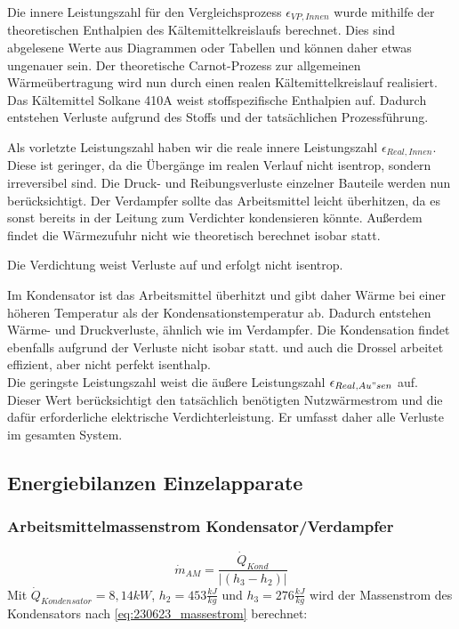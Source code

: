 Die innere Leistungszahl für den Vergleichsprozess $\epsilon_{VP,Innen}$ wurde mithilfe der theoretischen Enthalpien des Kältemittelkreislaufs berechnet.
Dies sind abgelesene Werte aus Diagrammen oder Tabellen und können daher etwas ungenauer sein. 
Der theoretische Carnot-Prozess zur allgemeinen Wärmeübertragung wird nun durch einen realen Kältemittelkreislauf realisiert. 
Das Kältemittel Solkane 410A weist stoffspezifische Enthalpien auf. 
Dadurch entstehen Verluste aufgrund des Stoffs und der tatsächlichen Prozessführung.

Als vorletzte Leistungszahl haben wir die reale innere Leistungszahl $\epsilon_{Real,Innen}$.
Diese ist geringer, da die Übergänge im realen Verlauf nicht isentrop, sondern irreversibel sind. 
Die Druck- und Reibungsverluste einzelner Bauteile werden nun berücksichtigt. 
Der Verdampfer sollte das Arbeitsmittel leicht überhitzen, da es sonst bereits in der Leitung zum Verdichter kondensieren könnte. 
Außerdem findet die Wärmezufuhr nicht wie theoretisch berechnet isobar statt.

Die Verdichtung weist Verluste auf und erfolgt nicht isentrop.

Im Kondensator ist das Arbeitsmittel überhitzt und gibt daher Wärme bei einer höheren Temperatur als der Kondensationstemperatur ab. 
Dadurch entstehen Wärme- und Druckverluste, ähnlich wie im Verdampfer. 
Die Kondensation findet ebenfalls aufgrund der Verluste nicht isobar statt.
und auch die  Drossel arbeitet effizient, aber nicht perfekt isenthalp.
\\
Die geringste Leistungszahl weist die äußere Leistungszahl $\epsilon_{Real,Au"sen}$ auf. 
Dieser Wert berücksichtigt den tatsächlich benötigten Nutzwärmestrom und die dafür erforderliche elektrische Verdichterleistung. 
Er umfasst daher alle Verluste im gesamten System.


\subsection{Energiebilanzen Einzelapparate}
\label{subsec:Massenstrom}
\subsubsection{Arbeitsmittelmassenstrom Kondensator/Verdampfer}
\begin{equation}
   \dot m_{AM} = \frac{\dot Q_{Kond}}{|(h_3 - h_2)|}
   \label{eq:230623_massestrom}
\end{equation}
Mit $\dot Q_{Kondensator}=8,14kW$, $h_2=453\frac{kJ}{kg}$ und $h_3=276\frac{kJ}{kg}$ wird der Massenstrom des Kondensators nach \autoref*{eq:230623_massestrom} berechnet:

